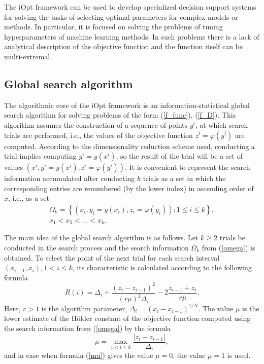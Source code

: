 \documentclass[iicol]{sn-jnl}
\theoremstyle{thmstyleone}%
\theoremstyle{thmstyletwo}%
\theoremstyle{thmstylethree}%
\begin{document}
The iOpt framework can be used to develop specialized decision support systems for solving the tasks of selecting optimal parameters for complex models or methods.
\textcolor[rgb]{0,0,1}{In particular, it is focused on solving the problems of tuning hyperparameters of machine learning methods. In such problems there is a lack of analytical description of the objective function and the function itself can be multi-extremal.}

\subsection{Global search algorithm}\label{sec_GSA}

The algorithmic core of the iOpt framework is an information-statistical global search algorithm for solving problems of the form (\ref{f_func}), (\ref{f_D}). This algorithm assumes the construction of a sequence of points $y^i$,  at which search trials are performed, i.e., the values of the objective function $z^i = \varphi(y^i)$ are computed. According to the dimensionality reduction scheme used, conducting a trial implies computing $y^i=y(x^i)$, so the result of the trial will be a set of values $(x^i, y^i=y(x^i), z^i = \varphi(y^i))$. 
It is convenient to represent the search information accumulated after conducting $k$ trials as a set in which the corresponding entries are renumbered (by the lower index) in ascending order of $x$, i.e., as a set 
\begin{multline}\label{omega}
\Omega_k = \left\{  (x_i, y_i=y(x_i), z_i = \varphi(y_i)): 1 \leq i \leq k  \right\},\\
x_1 < x_2 < ... < x_k.
\end{multline}

The main idea of the global search algorithm is as follows. Let $k \geq 2$ trials be conducted in the search process and the search information $\Omega_k$ from (\ref{omega}) is obtained. To select the point of the next trial for each search interval $(x_{i-1},x_i), 1<i\leq k$, its characteristic is calculated according to the following formula
\begin{equation}\label{R}
R(i) = \Delta_i + \frac{(z_i-z_{i-1})^2}{(r\mu)^2\Delta_i}-2\frac{z_{i-1}+z_i}{r\mu}.	
\end{equation}
Here, $r>1$ is the algorithm parameter, $\Delta_i=(x_i-x_{i-1})^{1/N}$.  The value $\mu$ is the lower estimate of the H\"older constant of the objective function computed using the search information from (\ref{omega}) by the formula
\begin{equation}\label{mu}
\mu = \max_{1<i\leq k}\frac{\left|z_i-z_{i-1}\right|}{\Delta_i},
\end{equation}
and in case when formula (\ref{mu}) gives the value $\mu=0$, the value $\mu=1$ is used.
\end{document}
